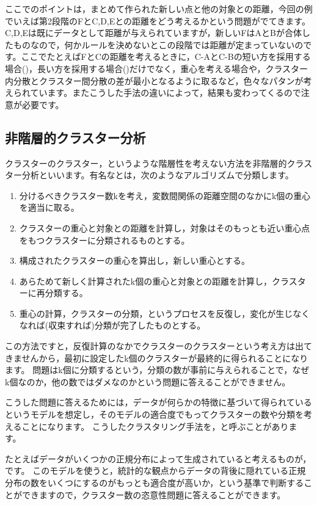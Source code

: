 \documentclass{ltjsbook}
\begin{document}
ここでのポイントは，まとめて作られた新しい点と他の対象との距離，今回の例でいえば第2段階のFとC,D,Eとの距離をどう考えるかという問題がでてきます。C,D,Eは既にデータとして距離が与えられていますが，新しいFはAとBが合体したものなので，何かルールを決めないとこの段階では距離が定まっていないのです。ここでたとえばFとCの距離を考えるときに，C-AとC-Bの短い方を採用する場合()，長い方を採用する場合()だけでなく，重心を考える場合や，クラスター内分散とクラスター間分散の差が最小となるように取るなど，色々なパタンが考えられています。またこうした手法の違いによって，結果も変わってくるので注意が必要です。

\subsection{非階層的クラスター分析}
クラスターのクラスター，というような階層性を考えない方法を非階層的クラスター分析といいます。有名なとは，次のようなアルゴリズムで分類します。
\begin{enumerate}
	\item 分けるべきクラスター数kを考え，変数間関係の距離空間のなかにk個の重心を適当に取る。
	\item クラスターの重心と対象との距離を計算し，対象はそのもっとも近い重心点をもつクラスターに分類されるものとする。
	\item 構成されたクラスターの重心を算出し，新しい重心とする。
	\item あらためて新しく計算されたk個の重心と対象との距離を計算し，クラスターに再分類する。
	\item 重心の計算，クラスターの分類，というプロセスを反復し，変化が生じなくなれば(収束すれば)分類が完了したものとする。
\end{enumerate}
この方法ですと，反復計算のなかでクラスターのクラスターという考え方は出てきませんから，最初に設定したk個のクラスターが最終的に得られることになります。
問題はk個に分類するという，分類の数が事前に与えられることで，なぜk個なのか，他の数ではダメなのかという問題に答えることができません。

こうした問題に答えるためには，データが何らかの特徴に基づいて得られているというモデルを想定し，そのモデルの適合度でもってクラスターの数や分類を考えることになります。
こうしたクラスタリング手法を，と呼ぶことがあります。

たとえばデータがいくつかの正規分布によって生成されていると考えるものが，です。
このモデルを使うと，統計的な観点からデータの背後に隠れている正規分布の数をいくつにするのがもっとも適合度が高いか，という基準で判断することができますので，クラスター数の恣意性問題に答えることができます。
\end{document}

